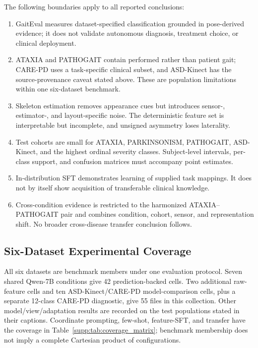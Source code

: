 The following boundaries apply to all reported conclusions:
\begin{enumerate}
\item GaitEval measures dataset-specified classification grounded in pose-derived evidence; it does not validate autonomous diagnosis, treatment choice, or clinical deployment.
\item ATAXIA and PATHOGAIT contain performed rather than patient gait; CARE-PD uses a task-specific clinical subset, and ASD-Kinect has the source-provenance caveat stated above. These are population limitations within one six-dataset benchmark.
\item Skeleton estimation removes appearance cues but introduces sensor-, estimator-, and layout-specific noise. The deterministic feature set is interpretable but incomplete, and unsigned asymmetry loses laterality.
\item Test cohorts are small for ATAXIA, PARKINSONISM, PATHOGAIT, ASD-Kinect, and the highest ordinal severity classes. Subject-level intervals, per-class support, and confusion matrices must accompany point estimates.
\item In-distribution SFT demonstrates learning of supplied task mappings. It does not by itself show acquisition of transferable clinical knowledge.
\item Cross-condition evidence is restricted to the harmonized ATAXIA--PATHOGAIT pair and combines condition, cohort, sensor, and representation shift. No broader cross-disease transfer conclusion follows.
\end{enumerate}


\subsection{Six-Dataset Experimental Coverage}
\label{sec:supp_six_coverage}

All six datasets are benchmark members under one evaluation protocol. Seven shared Qwen-7B conditions give 42 prediction-backed cells. Two additional raw-feature cells and ten ASD-Kinect/CARE-PD model-comparison cells, plus a separate 12-class CARE-PD diagnostic, give 55 files in this collection. Other model/view/adaptation results are recorded on the test populations stated in their captions. Coordinate prompting, few-shot, feature-SFT, and transfer have the coverage in Table~\ref{supp:tab:coverage_matrix}; benchmark membership does not imply a complete Cartesian product of configurations.

